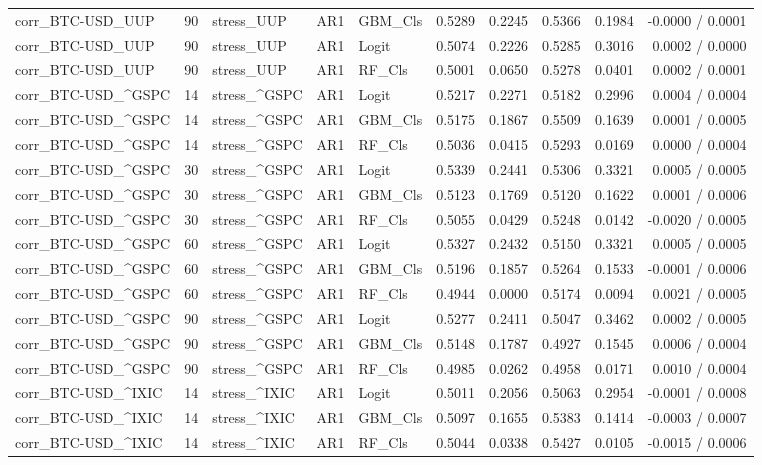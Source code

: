 \begin{table}[H]
\begin{tabular}{lllllrrrrr}
corr_BTC-USD_UUP & 90 & stress_UUP & AR1 & GBM_Cls & 0.5289 & 0.2245 & 0.5366 & 0.1984 & -0.0000 / 0.0001 \\
corr_BTC-USD_UUP & 90 & stress_UUP & AR1 & Logit & 0.5074 & 0.2226 & 0.5285 & 0.3016 & 0.0002 / 0.0000 \\
corr_BTC-USD_UUP & 90 & stress_UUP & AR1 & RF_Cls & 0.5001 & 0.0650 & 0.5278 & 0.0401 & 0.0002 / 0.0001 \\
corr_BTC-USD_^GSPC & 14 & stress_^GSPC & AR1 & Logit & 0.5217 & 0.2271 & 0.5182 & 0.2996 & 0.0004 / 0.0004 \\
corr_BTC-USD_^GSPC & 14 & stress_^GSPC & AR1 & GBM_Cls & 0.5175 & 0.1867 & 0.5509 & 0.1639 & 0.0001 / 0.0005 \\
corr_BTC-USD_^GSPC & 14 & stress_^GSPC & AR1 & RF_Cls & 0.5036 & 0.0415 & 0.5293 & 0.0169 & 0.0000 / 0.0004 \\
corr_BTC-USD_^GSPC & 30 & stress_^GSPC & AR1 & Logit & 0.5339 & 0.2441 & 0.5306 & 0.3321 & 0.0005 / 0.0005 \\
corr_BTC-USD_^GSPC & 30 & stress_^GSPC & AR1 & GBM_Cls & 0.5123 & 0.1769 & 0.5120 & 0.1622 & 0.0001 / 0.0006 \\
corr_BTC-USD_^GSPC & 30 & stress_^GSPC & AR1 & RF_Cls & 0.5055 & 0.0429 & 0.5248 & 0.0142 & -0.0020 / 0.0005 \\
corr_BTC-USD_^GSPC & 60 & stress_^GSPC & AR1 & Logit & 0.5327 & 0.2432 & 0.5150 & 0.3321 & 0.0005 / 0.0005 \\
corr_BTC-USD_^GSPC & 60 & stress_^GSPC & AR1 & GBM_Cls & 0.5196 & 0.1857 & 0.5264 & 0.1533 & -0.0001 / 0.0006 \\
corr_BTC-USD_^GSPC & 60 & stress_^GSPC & AR1 & RF_Cls & 0.4944 & 0.0000 & 0.5174 & 0.0094 & 0.0021 / 0.0005 \\
corr_BTC-USD_^GSPC & 90 & stress_^GSPC & AR1 & Logit & 0.5277 & 0.2411 & 0.5047 & 0.3462 & 0.0002 / 0.0005 \\
corr_BTC-USD_^GSPC & 90 & stress_^GSPC & AR1 & GBM_Cls & 0.5148 & 0.1787 & 0.4927 & 0.1545 & 0.0006 / 0.0004 \\
corr_BTC-USD_^GSPC & 90 & stress_^GSPC & AR1 & RF_Cls & 0.4985 & 0.0262 & 0.4958 & 0.0171 & 0.0010 / 0.0004 \\
corr_BTC-USD_^IXIC & 14 & stress_^IXIC & AR1 & Logit & 0.5011 & 0.2056 & 0.5063 & 0.2954 & -0.0001 / 0.0008 \\
corr_BTC-USD_^IXIC & 14 & stress_^IXIC & AR1 & GBM_Cls & 0.5097 & 0.1655 & 0.5383 & 0.1414 & -0.0003 / 0.0007 \\
corr_BTC-USD_^IXIC & 14 & stress_^IXIC & AR1 & RF_Cls & 0.5044 & 0.0338 & 0.5427 & 0.0105 & -0.0015 / 0.0006 \\

\end{tabular}
\end{table}
